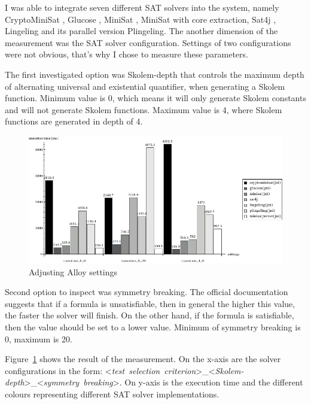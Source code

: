 I was able to integrate seven different SAT solvers into the system, namely CryptoMiniSat \cite{cryptominisat}, Glucose \cite{glucose}, MiniSat \cite{minisat}, MiniSat with core extraction, Sat4j \cite{sat4j}, Lingeling \cite{lingeling} and its parallel version Plingeling. The another dimension of the measurement was the SAT solver configuration. Settings of two configurations were not obvious, that's why I chose to measure these parameters.

The first investigated option was Skolem-depth that controls the maximum depth of alternating universal and existential quantifier, when generating a Skolem function. Minimum value is 0, which means it will only generate Skolem constants and will not generate Skolem functions. Maximum value is 4, where Skolem functions are generated in depth of 4.

\begin{figure}[htp]
\centering
\includegraphics[scale=0.55]{figures/measurements_alloy_settings}
\caption{Adjusting Alloy settings}
\label{fig:measurements_alloy_settings}
\end{figure}

Second option to inspect was symmetry breaking. The official documentation suggests that if a formula is unsatisfiable, then in general the higher this value, the faster the solver will finish. On the other hand, if the formula is satisfiable, then the value should be set to a lower value. Minimum of symmetry breaking is 0, maximum is 20.

Figure~\ref{fig:measurements_alloy_settings} shows the result of the measurement. On the x-axis are the solver configurations in the form: \mbox{<\textit{test selection criterion}>\_<\textit{Skolem-depth}>\_<\textit{symmetry breaking}>}. On y-axis is the execution time and the different colours representing different SAT solver implementations.

